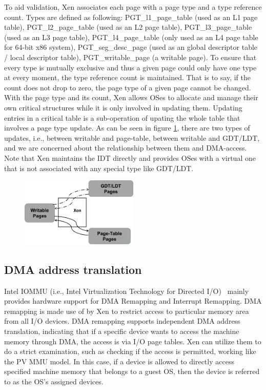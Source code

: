 To aid validation, Xen associates each page with a page type and a type reference count. Types are defined as following: PGT\_l1\_page\_table (used as an L1 page table), PGT\_l2\_page\_table (used as an L2 page table), PGT\_l3\_page\_table (used as an L3 page table), PGT\_l4\_page\_table (only used as an L4 page table for 64-bit x86 system), PGT\_seg\_desc\_page (used as an global descriptor table / local descriptor table), PGT\_writable\_page (a writable page). To ensure that every type is mutually exclusive and thus a given page could only have one type at every moment, the type reference count is maintained. That is to say, if the count does not drop to zero, the page type of a given page cannot be changed. With the page type and its count, Xen allows OSes to allocate and manage their own critical structures while it is only involved in updating them. Updating entries in a critical table  is a sub-operation of upating the whole table that involves a page type update. As can be seen in figure \ref{fig:page-type-update}, there are two types of updates, i.e., between writable and page-table, between writable and GDT/LDT, and we are concerned about the relationship between them and DMA-access. Note that Xen maintains the IDT directly and provides OSes with a virtual one that is not associated with any special type like GDT/LDT.

\begin{figure}[ht]
\centering
\includegraphics[width=0.5\textwidth]{image/background/page-type-update.png} \\
\caption{}
\label{fig:page-type-update}
\end{figure}

\subsection{DMA address translation}

Intel IOMMU (i.e., Intel Virtualization Technology for Directed I/O)~\cite{intelvt} mainly provides hardware support for DMA Remapping and Interrupt Remapping. DMA remapping is made use of by Xen to restrict access to particular memory area from all I/O devices. DMA remapping supports independent DMA address translation, indicating that if a specific device wants to access the machine memory through DMA, the access is via I/O page tables. Xen can utilize them to do a strict examination, such as checking if the access is permitted, working like the PV MMU model. In this case, if a device is allowed to directly access specified machine memory that belongs to a guest OS, then the device is referred to as the OS's assigned devices.

